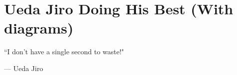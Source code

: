 
\setcounter{footnote}{0}
\chapter{Ueda Jiro Doing His Best (With diagrams)}
\epigraph{``I don't have a single second to waste!"}{--- \textup{Ueda Jiro}}